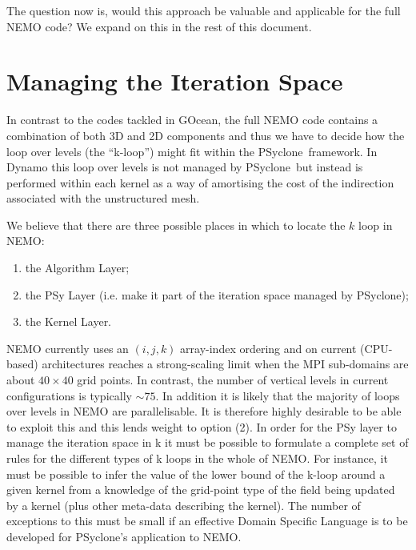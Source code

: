 \documentclass{article}
\newcommand{\psyclone}{{PS}yclone}
\begin{document}
The question now is, would this approach be valuable and applicable
for the full NEMO code? We expand on this in the rest of this document.

\section{Managing the Iteration Space}

In contrast to the codes tackled in GOcean, the full NEMO code
contains a combination of both 3D and 2D components and thus we have
to decide how the loop over levels (the ``k-loop'') might fit within
the \psyclone\ framework. In Dynamo this loop over levels is not
managed by \psyclone\ but instead is performed within each kernel as a
way of amortising the cost of the indirection associated with the
unstructured mesh.

We believe that there are three possible places in which to locate the
$k$ loop in NEMO:

\begin{enumerate}

\item the Algorithm Layer;

\item the PSy Layer (i.e. make it part of the iteration space managed
  by \psyclone);

\item the Kernel Layer.

\end{enumerate}

NEMO currently uses an $(i,j,k)$ array-index ordering and on current
(CPU-based) architectures reaches a strong-scaling limit when the MPI
sub-domains are about $40\times 40$ grid points. In contrast, the
number of vertical levels in current configurations is typically
$\sim75$. In addition it is likely that the majority of loops over
levels in NEMO are parallelisable. It is therefore highly desirable to
be able to exploit this and this lends weight to option (2). In order
for the PSy layer to manage the iteration space in k it must be
possible to formulate a complete set of rules for the different types
of k loops in the whole of NEMO. For instance, it must be possible to
infer the value of the lower bound of the k-loop around a given kernel
from a knowledge of the grid-point type of the field being updated by
a kernel (plus other meta-data describing the kernel). The number of
exceptions to this must be small if an effective Domain Specific
Language is to be developed for \psyclone's application to NEMO.
\end{document}
